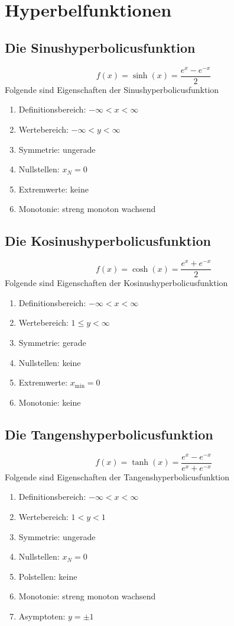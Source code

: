 \section{Hyperbelfunktionen}
\subsection{Die Sinushyperbolicusfunktion}
\begin{equation}
\boxed{f\left(x\right)=\sinh\left(x\right)=\dfrac{e^x-e^{-x}}{2}}
\end{equation}
Folgende sind Eigenschaften der Sinushyperbolicusfunktion
\begin{enumerate}[$(a)$]
\item Definitionsbereich: $-\infty<x<\infty$
\item Wertebereich: $-\infty<y<\infty$
\item Symmetrie: ungerade
\item Nullstellen: $x_N=0$
\item Extremwerte: keine
\item Monotonie: streng monoton wachsend
\end{enumerate}
\subsection{Die Kosinushyperbolicusfunktion}
\begin{equation}
\boxed{f\left(x\right)=\cosh\left(x\right)=\dfrac{e^x+e^{-x}}{2}}
\end{equation}
Folgende sind Eigenschaften der Kosinushyperbolicusfunktion
\begin{enumerate}[$(a)$]
\item Definitionsbereich: $-\infty<x<\infty$
\item Wertebereich: $1\leq y<\infty$
\item Symmetrie: gerade
\item Nullstellen: keine
\item Extremwerte: $x_{\text{min}}=0$
\item Monotonie: keine
\end{enumerate}
\subsection{Die Tangenshyperbolicusfunktion}
\begin{equation}
\boxed{f\left(x\right)=\tanh\left(x\right)=\dfrac{e^x-e^{-x}}{e^x+e^{-x}}}
\end{equation}
Folgende sind Eigenschaften der Tangenshyperbolicusfunktion
\begin{enumerate}[$(a)$]
\item Definitionsbereich: $-\infty<x<\infty$
\item Wertebereich: $1< y<1$
\item Symmetrie: ungerade
\item Nullstellen: $x_N=0$
\item Polstellen: keine
\item Monotonie: streng monoton wachsend
\item Asymptoten: $y=\pm 1$ 
\end{enumerate}
